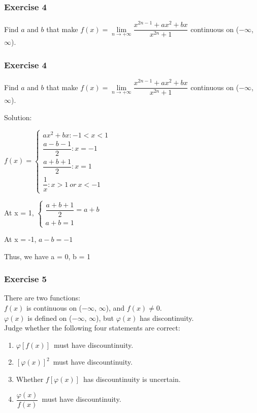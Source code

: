\begin{frame}
    \frametitle{Exercise 4}
    Find $a$ and $b$ that make $f(x) = \lim\limits_{\textit{n} \to +\infty}\dfrac{x^{2n - 1} + ax^{2} + bx}{x^{2n} + 1}$ continuous on ($-\infty$, $\infty$).
\end{frame}

\begin{frame}
    \frametitle{Exercise 4}
    Find $a$ and $b$ that make $f(x) = \lim\limits_{\textit{n} \to +\infty}\dfrac{x^{2n - 1} + ax^{2} + bx}{x^{2n} + 1}$ continuous on ($-\infty$, $\infty$).

    Solution:

    $f(x) = \begin{cases}
            ax^2 + bx: -1<x<1        \\
            \dfrac{a-b-1}{2}: x = -1 \\
            \dfrac{a+b+1}{2}: x = 1  \\
            \dfrac{1}{x}: x>1 \ or\  x<-1
        \end{cases}$

    At x = 1,
    $\begin{cases}
        \dfrac{a+b+1}{2} = a+b \\
        a+b = 1
    \end{cases}$

    At x = -1,
    $a - b = -1$

    Thus, we have a = 0, b = 1

\end{frame}

\begin{frame}
    \frametitle{Exercise 5}
    There are two functions:\\
    $f(x)$ is continuous on ($-\infty$, $\infty$), and $f(x) \neq 0$.\\
    $\varphi (x)$ is defined on ($-\infty$, $\infty$), but $\varphi (x)$ has discontinuity.\\
    \bigskip
    Judge whether the following four statements are correct:
    \begin{enumerate}
        \item $\varphi [f(x)]$\ must have discountinuity.
        \item $[\varphi (x)]^{2}$\ must have discountinuity.
        \item Whether $f[\varphi (x)]$\ has discountinuity is uncertain.
        \item $\dfrac{\varphi (x)}{f(x)}$\ must have discountinuity.
    \end{enumerate}
\end{frame}

